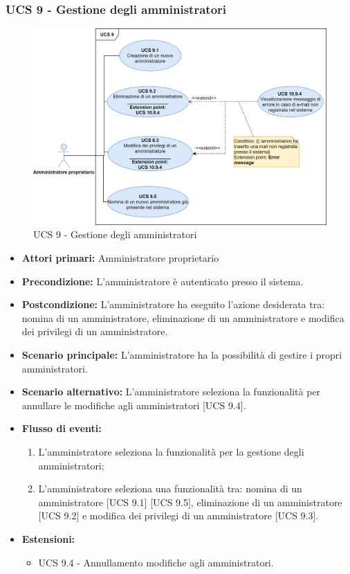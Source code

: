 \newpage

\subsubsection{UCS 9 - Gestione degli amministratori}%

\begin{figure}[h!]
    \centering
      \includegraphics[scale=0.5]{Sezioni/UseCase/Immagini/UCS9.png}
    \caption{UCS 9 - Gestione degli amministratori}
  \end{figure}
\begin{itemize}

\item \textbf{Attori primari:} Amministratore proprietario
\item \textbf{Precondizione:} L'amministratore è autenticato presso il sistema.
\item \textbf{Postcondizione:} L'amministratore ha eseguito l'azione desiderata tra: nomina di un amministratore, eliminazione di un amministratore e modifica dei privilegi di un amministratore.
\item \textbf{Scenario principale:} L'amministratore ha la possibilità di gestire i propri amministratori.
\item \textbf{Scenario alternativo:} L'amministratore seleziona la funzionalità per annullare le modifiche agli amministratori [UCS 9.4].
\item \textbf{Flusso di eventi:} %
  \begin{enumerate}
        \item L'amministratore seleziona la funzionalità per la gestione degli amministratori;
        \item L'amministratore seleziona una funzionalità tra: nomina di un amministratore [UCS 9.1] [UCS 9.5], eliminazione di un amministratore [UCS 9.2] e modifica dei privilegi di un amministratore [UCS 9.3].
    \end{enumerate}
\item \textbf{Estensioni:}
	\begin{itemize}
		\item UCS 9.4 - Annullamento modifiche agli amministratori.
	\end{itemize}
\end{itemize}


